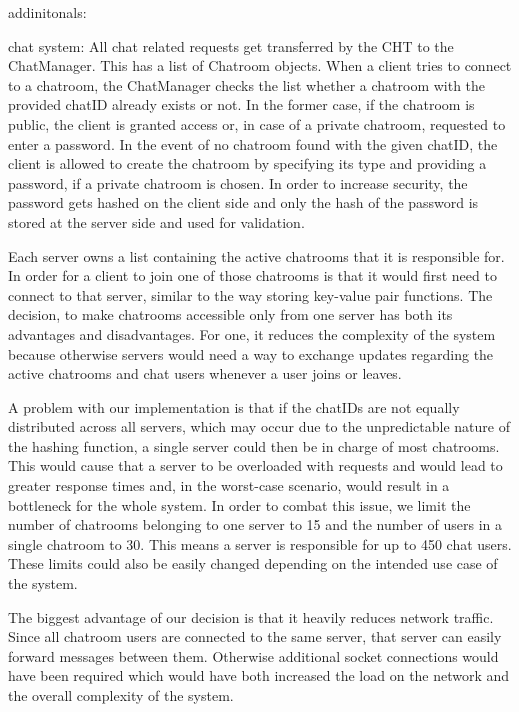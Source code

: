 addinitonals:

chat system:
All chat related requests get transferred by the CHT to the ChatManager. This has a list of Chatroom objects. When a client tries to connect to a chatroom, the ChatManager checks the list whether a chatroom with the provided chatID already exists or not. In the former case, 
if the chatroom is public, the client is granted access or, in case of a private chatroom, requested to enter a password. In the event of no chatroom found with the given chatID, the client is allowed to create the chatroom by specifying its type and providing a password, if a private chatroom is chosen. In order to increase security, the password gets hashed on the client side and only the hash of the password is stored at the server side and used for validation.


Each server owns a list containing the active chatrooms that it is responsible for. In order for a client to join one of those chatrooms is that it would first need to connect to that server, similar to the way storing key-value pair functions. The decision, to make chatrooms accessible only from one server has both its advantages and disadvantages. For one, it reduces the complexity of the system because otherwise servers would need a way to exchange updates regarding the active chatrooms and chat users whenever a user joins or leaves.

A problem with our implementation is that if the chatIDs are not equally distributed across all servers, which may occur due to the unpredictable nature of the hashing function, a single server could then be in charge of most chatrooms. This would cause that a server to be overloaded with requests and would lead to greater response times and, in the worst-case scenario, would result in a bottleneck for the whole system. In order to combat this issue, we limit the number of chatrooms belonging to one server to 15 and the number of users in a single chatroom to 30. This means a server is responsible for up to 450 chat users. These limits could also be easily changed depending on the intended use case of the system.

The biggest advantage of our decision is that it heavily reduces network traffic. Since all chatroom users are connected to the same server, that server can easily forward messages between them. Otherwise additional socket connections would have been required which would have both increased the load on the network and the overall complexity of the system.

